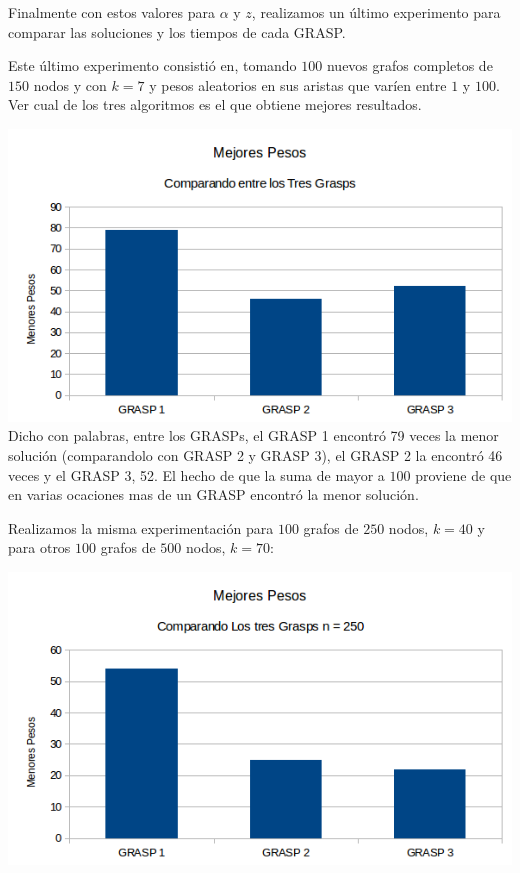 Finalmente con estos valores para $\alpha$ y $z$, realizamos un último experimento para comparar las soluciones y los tiempos de cada GRASP.

Este último experimento consistió en, tomando $100$ nuevos grafos completos de $150$ nodos y con $k = 7$ y pesos aleatorios en sus aristas que varíen entre $1$ y $100$. Ver cual de los tres algoritmos es el que obtiene mejores resultados.

\includegraphics[scale=0.7]{Ej5/CompetenciaGRASPs1.png}\\

Dicho con palabras, entre los GRASPs, el GRASP 1 encontró 79 veces la menor solución (comparandolo con GRASP 2 y GRASP 3), el GRASP 2 la encontró 46 veces y el GRASP 3, 52. El hecho de que la suma de mayor a $100$ proviene de que en varias ocaciones mas de un GRASP encontró la menor solución.

Realizamos la misma experimentación para $100$ grafos de $250$ nodos, $k = 40$ y para otros $100$ grafos de $500$ nodos, $k = 70$:

\includegraphics[scale=0.7]{Ej5/CompetenciaGRASPs2.png}\\

